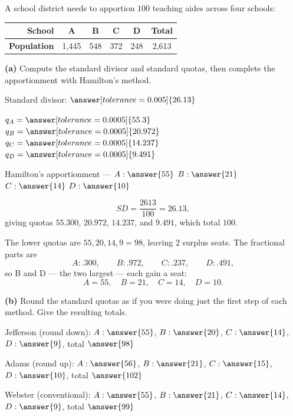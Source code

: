 \documentclass[12pt]{ximera}
\begin{document}
\begin{problem}
A school district needs to apportion $100$ teaching aides across four schools:

\begin{center}
\begin{tabular}{|r|c|c|c|c|c|}\hline
\textbf{School} & A & B & C & D & \textbf{Total}\\\hline
\textbf{Population} & 1{,}445 & 548 & 372 & 248 & 2{,}613 \\\hline
\end{tabular}
\end{center}

\begin{prompt}
\textbf{(a)} Compute the standard divisor and standard quotas, then complete the
apportionment with Hamilton's method.

Standard divisor: $\answer[tolerance=0.005]{26.13}$

\smallskip
$q_A = \answer[tolerance=0.0005]{55.3}$ \quad $q_B = \answer[tolerance=0.0005]{20.972}$
\quad $q_C = \answer[tolerance=0.0005]{14.237}$ \quad $q_D = \answer[tolerance=0.0005]{9.491}$

\smallskip
Hamilton's apportionment --- $A: \answer{55}$ \quad $B: \answer{21}$ \quad
$C: \answer{14}$ \quad $D: \answer{10}$

\begin{feedback}
\[ SD = \frac{2613}{100} = 26.13, \]
giving quotas $55.300$, $20.972$, $14.237$, and $9.491$, which total $100$. \checkmark

The lower quotas are $55, 20, 14, 9 = 98$, leaving $2$ surplus seats. The fractional
parts are
\[ A: .300, \qquad B: .972, \qquad C: .237, \qquad D: .491, \]
so B and D --- the two largest --- each gain a seat:
\[ A = 55, \quad B = 21, \quad C = 14, \quad D = 10. \]
\end{feedback}
\end{prompt}

\begin{prompt}
\textbf{(b)} Round the standard quotas as if you were doing just the first step of each
method. Give the resulting totals.

Jefferson (round down): $A: \answer{55}$, $B: \answer{20}$, $C: \answer{14}$,
$D: \answer{9}$, total $\answer{98}$

\smallskip
Adams (round up): $A: \answer{56}$, $B: \answer{21}$, $C: \answer{15}$, $D: \answer{10}$,
total $\answer{102}$

\smallskip
Webster (conventional): $A: \answer{55}$, $B: \answer{21}$, $C: \answer{14}$,
$D: \answer{9}$, total $\answer{99}$


\end{prompt}
\end{problem}
\end{document}
